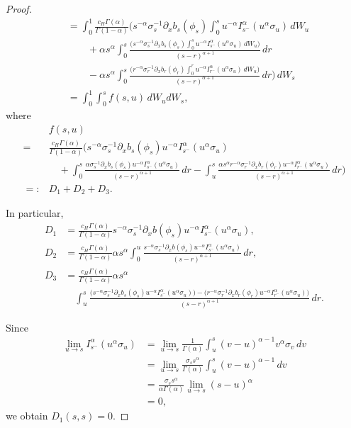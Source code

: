 \documentclass[preprint,12pt]{elsarticle}
\theoremstyle{definition}  %
\theoremstyle{plain}  %
\begin{document}
\begin{proof}
\begin{align*}
	&=\int_0^1  \frac{c_H\Gamma(\alpha)}{\Gamma(1-\alpha)} 
	\Bigg(
	 		s^{-\alpha}\sigma_s^{-1}\partial_x b_s(\phi_s)
	 		\int_0^s u^{-\alpha}I_{s^-}^\alpha (u^\alpha  \sigma_u)\, dW_u  \\ %
	 		&\qquad+\alpha s^\alpha\int_0^s \frac{ 
	 		\big(s^{-\alpha}\sigma_s^{-1}\partial_x b_s(\phi_s)\int_0^s u^{-\alpha}I_{s^{-}}^\alpha (u^\alpha  \sigma_u)\, dW_u\big) 
		}{(s-r)^{\alpha+1}}\,dr  \\ %
        &\qquad-\alpha s^\alpha\int_0^s \frac{ 
	 		\big(r^{-\alpha}\sigma_r^{-1}\partial_x b_r(\phi_r)\int_0^r u^{-\alpha}I_{r^-}^\alpha (u^\alpha  \sigma_u)\, dW_u\big) 
		}{(s-r)^{\alpha+1}}\,dr \Bigg)\, dW_s \\ %
		&=\int_0^1 \int_0^s f(s,u)\, dW_u dW_s, %
\end{align*}
where   
\begin{align*}
	&f(s,u)\\
    =&\frac{c_H\Gamma(\alpha)}{\Gamma(1-\alpha)}	
	\Bigg(
	 		s^{-\alpha}\sigma_s^{-1}\partial_x b_s(\phi_s)u^{-\alpha}I_{s^-}^\alpha (u^\alpha  \sigma_u)  \\
	 		&\quad+\int_0^s \frac{\alpha \sigma_s^{-1}\partial_x b_s(\phi_s)u^{-\alpha}I_{s^-}^\alpha (u^\alpha \sigma_u)}{(s-r)^{\alpha+1}}\,dr
		 -\int_u^s  \frac{\alpha s^\alpha r^{-\alpha} \sigma_r^{-1}\partial_x b_r
         (\phi_r) u^{-\alpha}I_{r^-}^\alpha (u^\alpha \sigma_u) }{(s-r)^{\alpha+1}}\,dr \Bigg) \\
		=:&D_1+D_2+D_3.
\end{align*}

In particular,
\begin{align*}
    D_1 &= \frac{c_H\Gamma(\alpha)}{\Gamma(1-\alpha)} s^{-\alpha}\sigma_s^{-1}\partial_x b(\phi_s)u^{-\alpha}I_{s^-}^\alpha (u^\alpha \sigma_u),   \\
    D_2 &=  \frac{c_H\Gamma(\alpha)}{\Gamma(1-\alpha)} \alpha s^\alpha\int_0^u \frac{ s^{-\alpha}\sigma_s^{-1}\partial_x b(\phi_s)u^{-\alpha}I_{s^-}^\alpha (u^\alpha \sigma_u)}{(s-r)^{\alpha+1}}\,dr, \\
    D_3 &=  \frac{c_H\Gamma(\alpha)}{\Gamma(1-\alpha)} \alpha s^\alpha  \\
    &\quad \int_u^s \frac{ 
		\big(s^{-\alpha}\sigma_s^{-1}\partial_x b_s(\phi_s)u^{-\alpha}I_{s^-}^\alpha (u^\alpha\sigma_u)\big) 
		-\big(r^{-\alpha}\sigma_r^{-1}\partial_x b_r(\phi_r)u^{-\alpha}I_{r^-}^\alpha (u^\alpha\sigma_u)\big)}
		{(s-r)^{\alpha+1}}\,dr . 
\end{align*}

Since 
\begin{align*}
	\lim_{u\to s} I_{s^-}^\alpha (u^\alpha  \sigma_u) 
	&=\lim_{u\to s}\frac{1}{\Gamma(\alpha)}\int_u^s (v-u)^{\alpha-1} v^\alpha  \sigma_v\,dv\\
	&=\lim_{u\to s}\frac{\sigma_s s^\alpha}{\Gamma(\alpha)}\int_u^s (v-u)^{\alpha-1}\,dv\\
	&=\frac{\sigma_s s^\alpha}{\alpha\Gamma(\alpha)}\lim_{u\to s} (s-u)^\alpha\\
	&=0,
\end{align*}
we obtain $D_1(s,s)=0.$


\end{proof}
\end{document}
